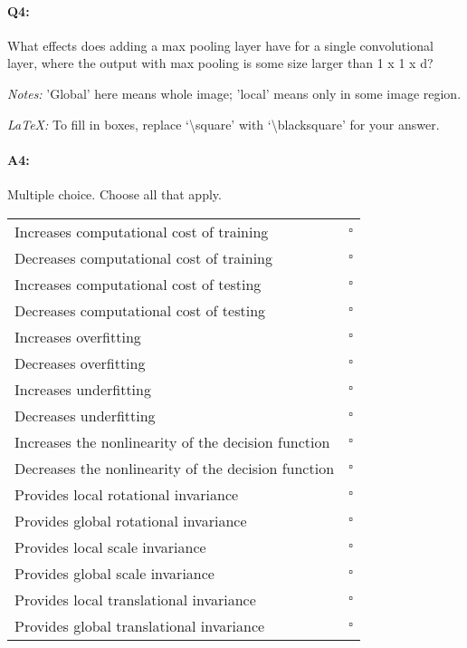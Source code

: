 

\pagebreak
\paragraph{Q4:} What effects does adding a max pooling layer have for a single convolutional layer, where the output with max pooling is some size larger than 1 x 1 x d?

\emph{Notes:} 'Global' here means whole image; 'local' means only in some image region.

\emph{LaTeX:} To fill in boxes, replace `\textbackslash square' with `\textbackslash blacksquare' for your answer.

\paragraph{A4:} Multiple choice. Choose all that apply. 

\begin{tabular}[h]{lr}
\toprule
Increases computational cost of training & $\square$ \\
Decreases computational cost of training & $\square$ \\
Increases computational cost of testing & $\square$ \\
Decreases computational cost of testing & $\square$ \\
\midrule
Increases overfitting & $\square$ \\
Decreases overfitting & $\square$ \\
Increases underfitting & $\square$ \\
Decreases underfitting & $\square$ \\
\midrule
Increases the nonlinearity of the decision function & $\square$ \\
Decreases the nonlinearity of the decision function & $\square$ \\
\midrule
Provides local rotational invariance & $\square$ \\
Provides global rotational invariance & $\square$ \\
Provides local scale invariance & $\square$ \\
Provides global scale invariance & $\square$ \\
Provides local translational invariance & $\square$ \\
Provides global translational invariance & $\square$ \\
\bottomrule
\end{tabular}


